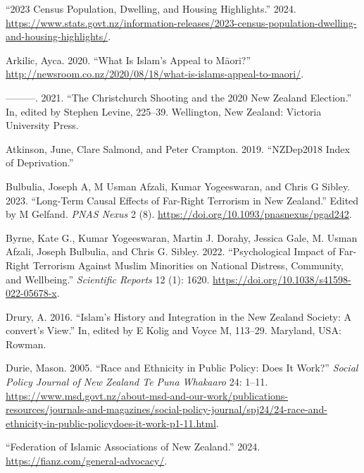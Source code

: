 \documentclass[
]{interact}
\newlength{\cslhangindent}
\newenvironment{CSLReferences}[2] %
 {\begin{list}{}{%
  \setlength{\itemindent}{0pt}
  \setlength{\leftmargin}{0pt}
  \setlength{\parsep}{0pt}
  \ifodd #1
   \setlength{\leftmargin}{\cslhangindent}
   \setlength{\itemindent}{-1\cslhangindent}
  \fi
  \setlength{\itemsep}{#2\baselineskip}}}
 {\end{list}}
\begin{document}
\label{refs}
\begin{CSLReferences}{1}{0}
{``2023 {C}ensus {P}opulation, {D}welling, and {H}ousing
{H}ighlights.''} 2024.
\url{https://www.stats.govt.nz/information-releases/2023-census-population-dwelling-and-housing-highlights/}.

Arkilic, Ayca. 2020. {``What Is {I}slam's Appeal to {M}{ā}ori?''}
\url{http://newsroom.co.nz/2020/08/18/what-is-islams-appeal-to-maori/}.

---------. 2021. {``The {C}hristchurch Shooting and the 2020 {N}ew
{Z}ealand Election.''} In, edited by Stephen Levine, 225--39.
Wellington, New Zealand: Victoria University Press.

Atkinson, June, Clare Salmond, and Peter Crampton. 2019. {``NZDep2018
Index of Deprivation.''}

Bulbulia, Joseph A, M Usman Afzali, Kumar Yogeeswaran, and Chris G
Sibley. 2023. {``Long-Term Causal Effects of Far-Right Terrorism in New
Zealand.''} Edited by M Gelfand. \emph{PNAS Nexus} 2 (8).
\url{https://doi.org/10.1093/pnasnexus/pgad242}.

Byrne, Kate G., Kumar Yogeeswaran, Martin J. Dorahy, Jessica Gale, M.
Usman Afzali, Joseph Bulbulia, and Chris G. Sibley. 2022.
{``Psychological Impact of Far-Right Terrorism Against Muslim Minorities
on National Distress, Community, and Wellbeing.''} \emph{Scientific
Reports} 12 (1): 1620. \url{https://doi.org/10.1038/s41598-022-05678-x}.

Drury, A. 2016. {``{Islam{'}s} History and Integration in the {N}ew
{Z}ealand Society: A {convert{'}s} View.''} In, edited by E Kolig and
Voyce M, 113--29. Maryland, USA: Rowman.

Durie, Mason. 2005. {``Race and Ethnicity in Public Policy: Does It
Work?''} \emph{Social Policy Journal of New Zealand Te Puna Whakaaro}
24: 1--11.
\url{https://www.msd.govt.nz/about-msd-and-our-work/publications-resources/journals-and-magazines/social-policy-journal/spj24/24-race-and-ethnicity-in-public-policydoes-it-work-p1-11.html}.

{``Federation of Islamic Associations of New Zealand.''} 2024.
\url{https://fianz.com/general-advocacy/}.


\end{CSLReferences}
\end{document}
